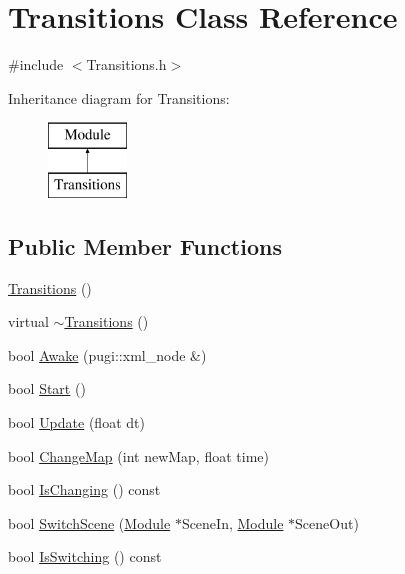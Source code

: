 \hypertarget{class_transitions}{}\section{Transitions Class Reference}
\label{class_transitions}


{\ttfamily \#include $<$Transitions.\+h$>$}

Inheritance diagram for Transitions\+:\begin{figure}[H]
\begin{center}
\leavevmode
\includegraphics[height=2.000000cm]{class_transitions}
\end{center}
\end{figure}
\subsection*{Public Member Functions}
\begin{DoxyCompactItemize}
\item 
\mbox{\hyperlink{class_transitions_af96d7b6a2b00135dddde4a8ad82da793}{Transitions}} ()
\item 
virtual \mbox{\hyperlink{class_transitions_a7fb3662acd43702a9483e07bf1e96eec}{$\sim$\+Transitions}} ()
\item 
bool \mbox{\hyperlink{class_transitions_a7280d32c9949be8e1211f945df187e15}{Awake}} (pugi\+::xml\+\_\+node \&)
\item 
bool \mbox{\hyperlink{class_transitions_abc46bf6e67d0936641cc1d41c20e8be9}{Start}} ()
\item 
bool \mbox{\hyperlink{class_transitions_acd6dd9daa6a80dd1b1e8330aa06c21c9}{Update}} (float dt)
\item 
bool \mbox{\hyperlink{class_transitions_a1a4e4a4b96eaa66b89dd7cbc0fdeb32f}{Change\+Map}} (int new\+Map, float time)
\item 
bool \mbox{\hyperlink{class_transitions_abc603bdac6ec85d49fb08049a43d97a7}{Is\+Changing}} () const
\item 
bool \mbox{\hyperlink{class_transitions_ae703df82a3b0e3868a69d31c10254c4d}{Switch\+Scene}} (\mbox{\hyperlink{class_module}{Module}} $\ast$Scene\+In, \mbox{\hyperlink{class_module}{Module}} $\ast$Scene\+Out)
\item 
bool \mbox{\hyperlink{class_transitions_ac94a8b975914bbdaaae2bdc097e252a2}{Is\+Switching}} () const
\end{DoxyCompactItemize}
